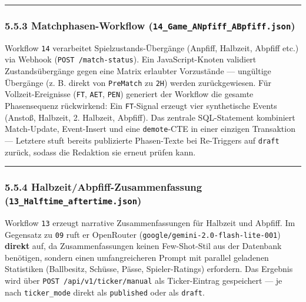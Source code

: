 \begin{center}\rule{0.5\linewidth}{0.5pt}\end{center}

\subsubsection{\texorpdfstring{5.5.3 Matchphasen-Workflow
(\texttt{14\_Game\_ANpfiff\_ABpfiff.json})}{5.5.3 Matchphasen-Workflow (14\_Game\_ANpfiff\_ABpfiff.json)}}\label{matchphasen-workflow-14_game_anpfiff_abpfiff.json}

Workflow \texttt{14} verarbeitet Spielzustands-Übergänge (Anpfiff,
Halbzeit, Abpfiff etc.) via Webhook (\texttt{POST\ /match-status}). Ein
JavaScript-Knoten validiert Zustandsübergänge gegen eine Matrix
erlaubter Vorzustände --- ungültige Übergänge (z. B. direkt von
\texttt{PreMatch} zu \texttt{2H}) werden zurückgewiesen. Für
Vollzeit-Ereignisse (\texttt{FT}, \texttt{AET}, \texttt{PEN}) generiert
der Workflow die gesamte Phasensequenz rückwirkend: Ein
\texttt{FT}-Signal erzeugt vier synthetische Events (Anstoß, Halbzeit,
2. Halbzeit, Abpfiff). Das zentrale SQL-Statement kombiniert
Match-Update, Event-Insert und eine \texttt{demote}-CTE in einer
einzigen Transaktion --- Letztere stuft bereits publizierte Phasen-Texte
bei Re-Triggers auf \texttt{draft} zurück, sodass die Redaktion sie
erneut prüfen kann.

\begin{center}\rule{0.5\linewidth}{0.5pt}\end{center}

\subsubsection{\texorpdfstring{5.5.4 Halbzeit/Abpfiff-Zusammenfassung
(\texttt{13\_Halftime\_aftertime.json})}{5.5.4 Halbzeit/Abpfiff-Zusammenfassung (13\_Halftime\_aftertime.json)}}\label{halbzeitabpfiff-zusammenfassung-13_halftime_aftertime.json}

Workflow \texttt{13} erzeugt narrative Zusammenfassungen für Halbzeit
und Abpfiff. Im Gegensatz zu \texttt{09} ruft er OpenRouter
(\texttt{google/gemini-2.0-flash-lite-001}) \textbf{direkt} auf, da
Zusammenfassungen keinen Few-Shot-Stil aus der Datenbank benötigen,
sondern einen umfangreicheren Prompt mit parallel geladenen Statistiken
(Ballbesitz, Schüsse, Pässe, Spieler-Ratings) erfordern. Das Ergebnis
wird über \texttt{POST\ /api/v1/ticker/manual} als Ticker-Eintrag
gespeichert --- je nach \texttt{ticker\_mode} direkt als
\texttt{published} oder als \texttt{draft}.

